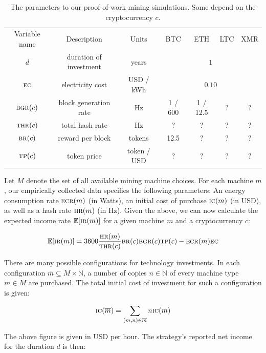 \begin{table}
  \centering
  \begin{tabular}{|c|c|c|c|c|c|c|}
    \hline
    Variable name & Description & Units & BTC & ETH & LTC & XMR\\
    \hhline{|=|=|=|=|=|=|=|}
    $d$ & duration of investment & years & \multicolumn{4}{c|}{$1$} \\
    \hline
    $\textsc{ec}$ & electricity cost & USD / kWh & \multicolumn{4}{c|}{$0.10$} \\
    \hline
    $\textsc{bgr}(c)$ & block generation rate & Hz & 1 / 600 & 1 / 12.5 & ? & ? \\
    \hline
    $\textsc{thr}(c)$ & total hash rate & Hz & ? & ? & ? & ? \\
    \hline
    $\textsc{br}(c)$ & reward per block & tokens & 12.5 & ? & ? & ?\\
    \hline
    $\textsc{tp}(c)$ & token price & token / USD & ? & ? & ? & ?\\
    \hline
  \end{tabular}
  \caption{The parameters to our proof-of-work mining simulations. Some depend on the cryptocurrency $c$.}
  \label{tbl:work-constants}
\end{table}



Let $M$ denote the set of all available mining machine choices. For each machine
$m$, our empirically collected data specifies the following parameters: An
energy consumption rate $\textsc{ecr}(m)$ (in Watts), an initial cost of purchase $\textsc{ic}(m)$
(in USD), as well as a hash rate $\textsc{hr}(m)$ (in Hz). Given the above, we can now
calculate the expected income rate $\mathbb{E}[\textsc{ir}(m)]$ for a given machine $m$
and a cryptocurrency $c$:

\[
\mathbb{E}[\textsc{ir}(m)] = 3600 \frac{\textsc{hr}(m)}{\textsc{thr}(c)}\textsc{br}(c)\textsc{bgr}(c)\textsc{tp}(c) - \textsc{ecr}(m) \textsc{ec}
\]

There are many possible configurations for technology investments. In each
configuration $\overline{m} \subseteq M \times \mathbb{N}$, a number of copies
$n \in \mathbb{N}$ of every machine type $m \in M$ are purchased. The total
initial cost of investment for such a configuration is given:

\[
  \textsc{ic}(\overline{m}) = \sum_{(m, n) \in \overline{m}}{n\textsc{ic}(m)}
\]

The above figure is given in USD per hour. The strategy's reported net income
for the duration $d$ is then:

